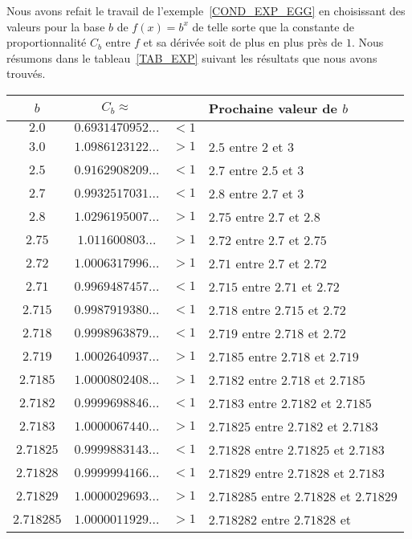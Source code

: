 {Nous avons refait le travail de l'exemple~\ref{COND_EXP_EGG} en choisissant
des valeurs pour la base $b$ de $f(x) = b^x$ de telle sorte que la
constante de proportionnalité $C_b$ entre $f$ et sa dérivée soit de
plus en plus près de $1$.  Nous résumons dans le tableau~\ref{TAB_EXP}
suivant les résultats que nous avons trouvés.

\begin{table}
{\scriptsize
\begin{center}
\begin{tabular}{|c|c|c|l|}
\hline
$b$ & $C_b \approx $ & & Prochaine valeur de $b$ \\
\hline
$2.0$ & $0.6931470952\ldots$ & $<1$ & \\
$3.0$ & $1.0986123122\ldots$ & $>1$ & $2.5$ entre $2$ et $3$ \\
$2.5$ & $0.9162908209\ldots$ & $<1$ & $2.7$ entre $2.5$ et $3$ \\
$2.7$ & $0.9932517031\ldots$ & $<1$ & $2.8$ entre $2.7$ et $3$ \\
$2.8$ & $1.0296195007\ldots$ & $>1$ & $2.75$ entre $2.7$ et $2.8$ \\
$2.75$ & $1.011600803\ldots$ & $>1$ & $2.72$ entre $2.7$ et $2.75$ \\
$2.72$ & $1.0006317996\ldots$ & $>1$ & $2.71$ entre $2.7$ et $2.72$ \\
$2.71$ & $0.9969487457\ldots$ & $<1$ & $2.715$ entre $2.71$ et $2.72$ \\
$2.715$ & $0.9987919380\ldots$ & $<1$ & $2.718$ entre $2.715$ et $2.72$ \\
$2.718$ & $0.9998963879\ldots$ & $<1$ & $2.719$ entre $2.718$ et $2.72$ \\
$2.719$ & $1.0002640937\ldots$ & $>1$ & $2.7185$ entre $2.718$ et $2.719$ \\
$2.7185$ & $1.0000802408\ldots$ & $>1$ & $2.7182$ entre $2.718$ et $2.7185$ \\
$2.7182$ & $0.9999698846\ldots$ & $<1$ & $2.7183$ entre $2.7182$ et $2.7185$ \\
$2.7183$ & $1.0000067440\ldots$ & $>1$ & $2.71825$ entre $2.7182$ et
$2.7183$ \\
$2.71825$ & $0.9999883143\ldots$ & $<1$ & $2.71828$ entre $2.71825$ et
$2.7183$ \\
$2.71828$ & $0.9999994166\ldots$ & $<1$ & $2.71829$ entre $2.71828$ et
$2.7183$ \\
$2.71829$ & $1.0000029693\ldots$ & $>1$ & $2.718285$ entre $2.71828$ et
$2.71829$ \\
$2.718285$ & $1.0000011929\ldots$ & $>1$ & $2.718282$ entre $2.71828$ et

\end{tabular}
\end{center}}
\end{table}}
